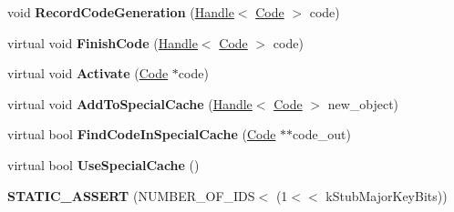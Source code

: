 \begin{DoxyCompactItemize}
\item 
void {\bfseries Record\+Code\+Generation} (\hyperlink{classv8_1_1internal_1_1_handle}{Handle}$<$ \hyperlink{classv8_1_1internal_1_1_code}{Code} $>$ code)\hypertarget{classv8_1_1internal_1_1_b_a_s_e___e_m_b_e_d_d_e_d_a124a171122139618a57471a9f6a1719b}{}\label{classv8_1_1internal_1_1_b_a_s_e___e_m_b_e_d_d_e_d_a124a171122139618a57471a9f6a1719b}

\item 
virtual void {\bfseries Finish\+Code} (\hyperlink{classv8_1_1internal_1_1_handle}{Handle}$<$ \hyperlink{classv8_1_1internal_1_1_code}{Code} $>$ code)\hypertarget{classv8_1_1internal_1_1_b_a_s_e___e_m_b_e_d_d_e_d_a5797526e67f5a4316cd48bfad13cae71}{}\label{classv8_1_1internal_1_1_b_a_s_e___e_m_b_e_d_d_e_d_a5797526e67f5a4316cd48bfad13cae71}

\item 
virtual void {\bfseries Activate} (\hyperlink{classv8_1_1internal_1_1_code}{Code} $\ast$code)\hypertarget{classv8_1_1internal_1_1_b_a_s_e___e_m_b_e_d_d_e_d_a574097fa38afe6b91be1817194b9c774}{}\label{classv8_1_1internal_1_1_b_a_s_e___e_m_b_e_d_d_e_d_a574097fa38afe6b91be1817194b9c774}

\item 
virtual void {\bfseries Add\+To\+Special\+Cache} (\hyperlink{classv8_1_1internal_1_1_handle}{Handle}$<$ \hyperlink{classv8_1_1internal_1_1_code}{Code} $>$ new\+\_\+object)\hypertarget{classv8_1_1internal_1_1_b_a_s_e___e_m_b_e_d_d_e_d_ab0c666f48c9ead9e0b075a451f81ab97}{}\label{classv8_1_1internal_1_1_b_a_s_e___e_m_b_e_d_d_e_d_ab0c666f48c9ead9e0b075a451f81ab97}

\item 
virtual bool {\bfseries Find\+Code\+In\+Special\+Cache} (\hyperlink{classv8_1_1internal_1_1_code}{Code} $\ast$$\ast$code\+\_\+out)\hypertarget{classv8_1_1internal_1_1_b_a_s_e___e_m_b_e_d_d_e_d_a5fa8e0e1ceb9c2256c3a3aa9e42324fe}{}\label{classv8_1_1internal_1_1_b_a_s_e___e_m_b_e_d_d_e_d_a5fa8e0e1ceb9c2256c3a3aa9e42324fe}

\item 
virtual bool {\bfseries Use\+Special\+Cache} ()\hypertarget{classv8_1_1internal_1_1_b_a_s_e___e_m_b_e_d_d_e_d_ac8b82aebc81886bf172a60cb698fd38d}{}\label{classv8_1_1internal_1_1_b_a_s_e___e_m_b_e_d_d_e_d_ac8b82aebc81886bf172a60cb698fd38d}

\item 
{\bfseries S\+T\+A\+T\+I\+C\+\_\+\+A\+S\+S\+E\+RT} (N\+U\+M\+B\+E\+R\+\_\+\+O\+F\+\_\+\+I\+DS$<$ (1$<$$<$ k\+Stub\+Major\+Key\+Bits))\hypertarget{classv8_1_1internal_1_1_b_a_s_e___e_m_b_e_d_d_e_d_aefcd6fa7674a07020764b67b27f8e36c}{}\label{classv8_1_1internal_1_1_b_a_s_e___e_m_b_e_d_d_e_d_aefcd6fa7674a07020764b67b27f8e36c}


\end{DoxyCompactItemize}
